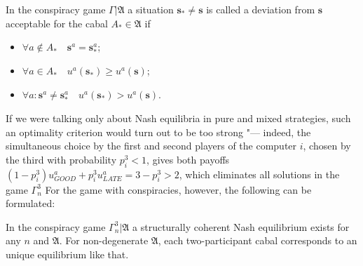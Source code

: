 \begin{definition}
	In the conspiracy game $\Gamma | \mathfrak{A}$ a situation $\mathbf{s}_* \neq \mathbf{s}$ is called a deviation from $\mathbf{s}$ acceptable for the cabal $A_* \in \mathfrak{A}$ if %
	\begin{itemize}
		\item $\forall a \notin A_* \quad \mathbf{s}^a = \mathbf{s}_*^a$;
		\item $\forall a \in A_* \quad u^a(\mathbf{s}_*) \geq u^a(\mathbf{s})$;
		\item $\forall a : \mathbf{s}^a \neq \mathbf{s}_*^a \quad u^a(\mathbf{s}_*) > u^a(\mathbf{s})$.
	\end{itemize}
\end{definition}

If we were talking only about Nash equilibria in pure and mixed strategies, such an optimality criterion would turn out to be too strong "--- indeed, the simultaneous choice by the first and second players of the computer $i$, chosen by the third with probability $p_i^3 < 1$, gives both payoffs $(1 - p_i^3) u^a_{GOOD} + p_i^3 u^a_{LATE} = 3 - p_i^3 > 2$, which eliminates all solutions in the game $\Gamma^3_n$ For the game with conspiracies, however, the following can be formulated: %

\begin{theorem}
	In the conspiracy game $\Gamma^3_n | \mathfrak{A}$ a structurally coherent Nash equilibrium exists for any $n$ and $\mathfrak{A}$. For non-degenerate $\mathfrak{A}$, each two-participant cabal corresponds to an unique equilibrium like that. %
\end{theorem}

